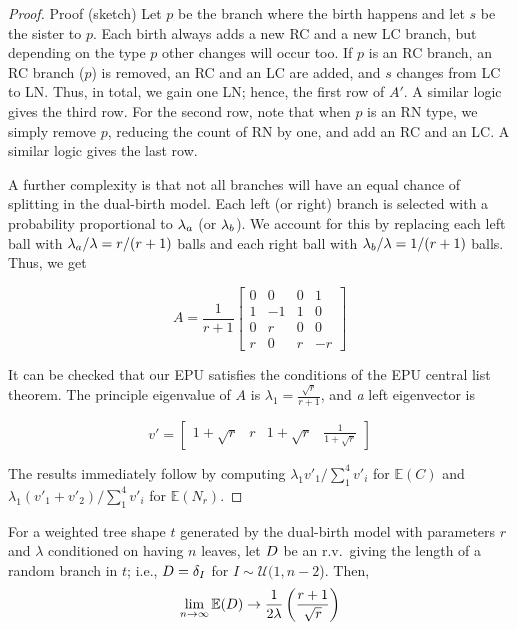 \begin{proof}{Proof (sketch)}
Let $p$ be the branch where the birth happens and let $s$ be the sister to $p$. Each birth always adds a new RC and a new LC branch, but depending on the type $p$
other changes will occur too. If $p$ is an RC branch, an RC branch ($p$) is removed, an RC and an LC are added, and $s$ changes from LC to LN. Thus, in total, we gain one LN; hence, the first row of $A'$. A similar logic gives the third row. For the second row, note that when $p$ is an RN type, we simply remove $p$, reducing the count of RN by one, and add an RC and an LC. A similar logic gives the last row. 

A further complexity is that not all branches will have an equal chance of splitting in the dual-birth model. Each left (or right) branch is selected with a probability proportional to $\lambda_a$ (or $\lambda_b$). We account for this by replacing each left ball with $\lambda_a/\lambda=r/(r+1)$ balls and each right ball with $\lambda_b/\lambda=1/(r+1)$ balls. Thus, we get

\begin{small}
$$
A= \frac{1}{r+1}
\begin{bmatrix} 
0& 0&  0& 1 \\
1& -1&  1& 0 \\
0& r&  0& 0 \\
r& 0&  r& -r 
\end{bmatrix}
$$ 
\end{small}

It can be checked that our \gls{EPU} satisfies the conditions of the \gls{EPU} central list theorem. The principle eigenvalue of $A$ is $\lambda_1=\frac{\sqrt{r}}{r+1}$, and \textit{a} left eigenvector is

\begin{small}
$$
v'= 
\begin{bmatrix}1+\sqrt{r}& r&  1+\sqrt{r}& \frac{1}{1+\sqrt{r}}
\end{bmatrix}$$
\end{small} 

The results immediately follow by computing $\lambda_1v'_1/\sum_1^4 v'_i$ for $\mathbb{E}(C)$ and $\lambda_1(v'_1+v'_2)/\sum_1^4 v'_i$ for $\mathbb{E}(N_r)$.
\end{proof}

\begin{theorem}
For a weighted tree shape $t$ generated by the dual-birth model with parameters $r$ and $\lambda$ conditioned on having $n$ leaves, let $D$ be an r.v.\ giving the length of a random branch in $t$; i.e., $D=\delta_I$ for $I\sim\mathcal{U}(1,n-2$). Then, 
\begin{align}\label{sup:eq:bl}
\lim_{n\to\infty}\mathbb{E}(D) \to \frac{1}{2\lambda}\left(\frac{r+1}{\sqrt{r}}\right)
\end{align}
\end{theorem}

